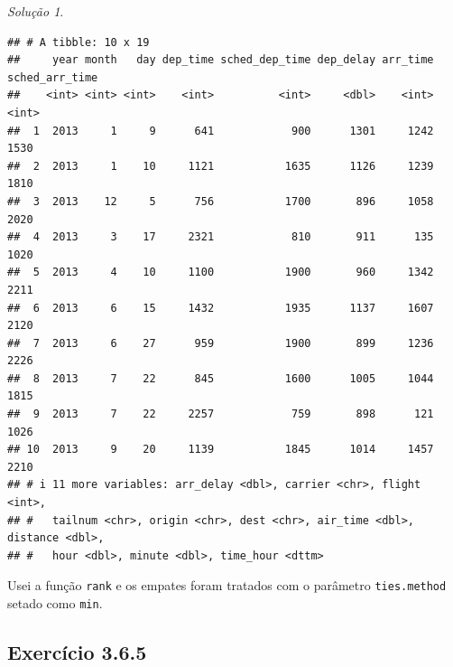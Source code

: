 \documentclass[
]{latex/krantz}
\newenvironment{Shaded}{\begin{snugshade}}{\end{snugshade}}
\newcommand{\AttributeTok}[1]{\textcolor[rgb]{0.13,0.29,0.53}{#1}}
\newcommand{\DecValTok}[1]{\textcolor[rgb]{0.00,0.00,0.81}{#1}}
\newcommand{\FunctionTok}[1]{\textcolor[rgb]{0.13,0.29,0.53}{\textbf{#1}}}
\newcommand{\NormalTok}[1]{#1}
\newcommand{\SpecialCharTok}[1]{\textcolor[rgb]{0.81,0.36,0.00}{\textbf{#1}}}
\newcommand{\StringTok}[1]{\textcolor[rgb]{0.31,0.60,0.02}{#1}}
\theoremstyle{definition}
\theoremstyle{definition}
\theoremstyle{definition}
\theoremstyle{definition}
\theoremstyle{remark}
\newtheorem*{solution}{Solução}
\begin{document}
\begin{solution}
\leavevmode

\begin{Shaded}
\end{Shaded}

\begin{verbatim}
## # A tibble: 10 x 19
##     year month   day dep_time sched_dep_time dep_delay arr_time sched_arr_time
##    <int> <int> <int>    <int>          <int>     <dbl>    <int>          <int>
##  1  2013     1     9      641            900      1301     1242           1530
##  2  2013     1    10     1121           1635      1126     1239           1810
##  3  2013    12     5      756           1700       896     1058           2020
##  4  2013     3    17     2321            810       911      135           1020
##  5  2013     4    10     1100           1900       960     1342           2211
##  6  2013     6    15     1432           1935      1137     1607           2120
##  7  2013     6    27      959           1900       899     1236           2226
##  8  2013     7    22      845           1600      1005     1044           1815
##  9  2013     7    22     2257            759       898      121           1026
## 10  2013     9    20     1139           1845      1014     1457           2210
## # i 11 more variables: arr_delay <dbl>, carrier <chr>, flight <int>,
## #   tailnum <chr>, origin <chr>, dest <chr>, air_time <dbl>, distance <dbl>,
## #   hour <dbl>, minute <dbl>, time_hour <dttm>
\end{verbatim}

Usei a função \texttt{rank} e os empates foram tratados com o parâmetro \texttt{ties.method} setado como \texttt{min}.

\end{solution}

\hypertarget{exr3-6-5}{%
\subsection*{Exercício 3.6.5}\label{exr3-6-5}}
\end{document}
